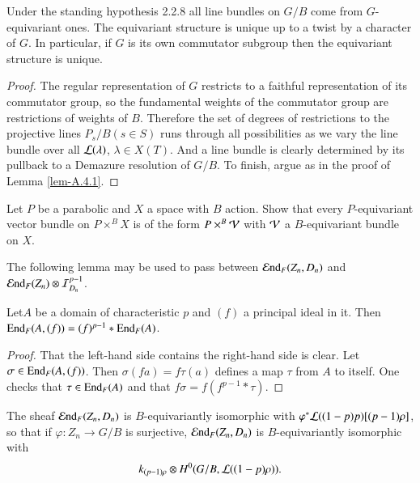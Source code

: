 \begin{corollary}\label{coro-A.4.3}
Under the standing hypothesis 2.2.8 all line bundles on $G/B$ come
from $G$-equivariant ones. The equivariant structure is unique up to a
twist by a character of $G$. In particular, if $G$ is its own
commutator subgroup then the equivariant structure is unique.
\end{corollary}

\begin{proof}
The regular representation of $G$ restricts to a faithful
representation of its commutator group, so the fundamental weights of
the commutator group are restrictions of weights of $B$. Therefore the
set of degrees of restrictions to the projective lines $P_{s}/B(s\in
S)$ runs through all possibilities as we vary the line bundle over all
$\mathcal{L}(\lambda)$, $\lambda\in X(T)$. And a line bundle is clearly
determined by its pullback to a Demazure resolution of $G/B$. To
finish, argue as in the proof of Lemma \ref{lem-A.4.1}.
\end{proof}

\begin{exercise}\label{exer-A.4.4}
Let $P$ be a parabolic and $X$ a space with $B$ action. Show that
every $P$-equivariant vector bundle on $P\times^{B}X$ is of the form
$P\times^{B}\mathcal{V}$ with $\mathcal{V}$ a $B$-equivariant bundle on $X$.
\end{exercise}

The following lemma may be used to pass between
$\operatorname{\mathcal{E}nd}_{F}(Z_{n},D_{n})$ and $\operatorname{\mathcal{E}nd}_{F}(Z_{n})\otimes
\mathcal{I}^{p-1}_{D_{n}}$. 

\begin{lemma}\label{lem-A.4.5}
Let\pageoriginale $A$\label{page86} be a domain of characteristic $p$ and $(f)$ a
principal ideal in it. Then $\operatorname{End}_{F}(A,(f))=(f)^{p-1}\ast \operatorname{End}_{F}(A)$.
\end{lemma}

\begin{proof}
That the left-hand side contains the right-hand side is clear. Let
$\sigma\in \operatorname{End}_{F}(A,(f))$. Then $\sigma(fa)=f\tau(a)$ defines a map
$\tau$ from $A$ to itself. One checks that $\tau\in \operatorname{End}_{F}(A)$ and
that $f\sigma=f(f^{p-1}\ast\tau)$.
\end{proof}

\begin{proposition}\label{prop-A.4.6}
The sheaf $\operatorname{\mathcal{E}nd}_{F}(Z_{n},D_{n})$ is $B$-equivariantly isomorphic
with $\varphi^{*}\mathcal{L}((1-p)p)[(p-1)\rho]$, so that if $\varphi:Z_{n}\to
G/B$ is surjective, $\operatorname{\mathcal{E}nd}_{F}(Z_{n},D_{n})$ is $B$-equivariantly
isomorphic with 
$$
k_{(p-1)\rho}\otimes H^{0}(G/B,\mathcal{L}((1-p)\rho)).
$$ 
\end{proposition}

